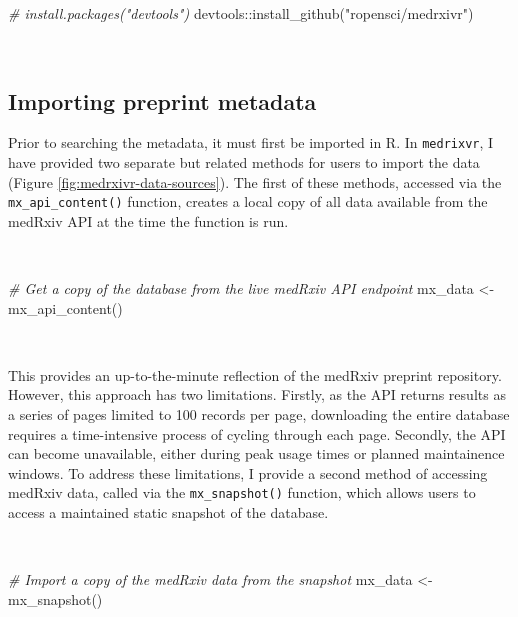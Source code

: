 \documentclass[a4paper, twoside]{templates/ociamthesis}
\newenvironment{Shaded}{\begin{snugshade}}{\end{snugshade}}
\newcommand{\CommentTok}[1]{\textcolor[rgb]{0.56,0.35,0.01}{\textit{#1}}}
\newcommand{\FunctionTok}[1]{\textcolor[rgb]{0.00,0.00,0.00}{#1}}
\newcommand{\NormalTok}[1]{#1}
\newcommand{\OtherTok}[1]{\textcolor[rgb]{0.56,0.35,0.01}{#1}}
\newcommand{\SpecialCharTok}[1]{\textcolor[rgb]{0.00,0.00,0.00}{#1}}
\newcommand{\StringTok}[1]{\textcolor[rgb]{0.31,0.60,0.02}{#1}}
\renewenvironment{Shaded}
{
  \vspace{4pt}%
  \begin{snugshade}%
}{%
  \end{snugshade}%
  \vspace{4pt}%
}
\begin{document}
\begin{Shaded}
\begin{Highlighting}[]
\CommentTok{\# install.packages("devtools") }
\NormalTok{devtools}\SpecialCharTok{::}\FunctionTok{install\_github}\NormalTok{(}\StringTok{"ropensci/medrxivr"}\NormalTok{)}
\end{Highlighting}
\end{Shaded}

~

\hypertarget{importing-preprint-metadata}{%
\subsection{Importing preprint metadata}\label{importing-preprint-metadata}}

Prior to searching the metadata, it must first be imported in R. In \texttt{medrixvr}, I have provided two separate but related methods for users to import the data (Figure \ref{fig:medrxivr-data-sources}). The first of these methods, accessed via the \texttt{mx\_api\_content()} function, creates a local copy of all data available from the medRxiv API at the time the function is run.

~

\begin{Shaded}
\begin{Highlighting}[]
\CommentTok{\# Get a copy of the database from the live medRxiv API endpoint}
\NormalTok{mx\_data }\OtherTok{\textless{}{-}} \FunctionTok{mx\_api\_content}\NormalTok{()}
\end{Highlighting}
\end{Shaded}

~

This provides an up-to-the-minute reflection of the medRxiv preprint repository. However, this approach has two limitations. Firstly, as the API returns results as a series of pages limited to 100 records per page, downloading the entire database requires a time-intensive process of cycling through each page. Secondly, the API can become unavailable, either during peak usage times or planned maintainence windows. To address these limitations, I provide a second method of accessing medRxiv data, called via the \texttt{mx\_snapshot()} function, which allows users to access a maintained static snapshot of the database.

~

\begin{Shaded}
\begin{Highlighting}[]
\CommentTok{\# Import a copy of the medRxiv data from the snapshot}
\NormalTok{mx\_data }\OtherTok{\textless{}{-}} \FunctionTok{mx\_snapshot}\NormalTok{()}
\end{Highlighting}
\end{Shaded}
\end{document}
